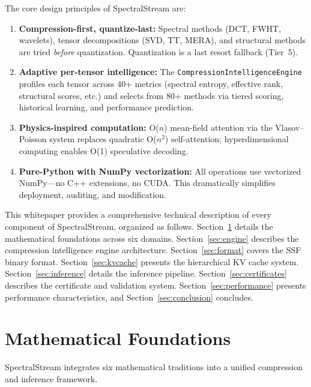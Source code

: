 \documentclass[11pt,a4paper,twocolumn]{article}
\begin{document}
The core design principles of SpectralStream are:

\begin{enumerate}
	\item \textbf{Compression-first, quantize-last:} Spectral methods (DCT, FWHT, wavelets), tensor decompositions (SVD, TT, MERA), and structural methods are tried \emph{before} quantization. Quantization is a last resort fallback (Tier~5).
	\item \textbf{Adaptive per-tensor intelligence:} The \texttt{CompressionIntelligenceEngine} profiles each tensor across 40+ metrics (spectral entropy, effective rank, structural scores, etc.) and selects from 80+ methods via tiered scoring, historical learning, and performance prediction.
	\item \textbf{Physics-inspired computation:} O($n$) mean-field attention via the Vlasov--Poisson system replaces quadratic O($n^2$) self-attention; hyperdimensional computing enables O(1) speculative decoding.
	\item \textbf{Pure-Python with NumPy vectorization:} All operations use vectorized NumPy---no C++ extensions, no CUDA. This dramatically simplifies deployment, auditing, and modification.
\end{enumerate}

This whitepaper provides a comprehensive technical description of every component of SpectralStream, organized as follows. Section~\ref{sec:math} details the mathematical foundations across six domains. Section~\ref{sec:engine} describes the compression intelligence engine architecture. Section~\ref{sec:format} covers the SSF binary format. Section~\ref{sec:kvcache} presents the hierarchical KV cache system. Section~\ref{sec:inference} details the inference pipeline. Section~\ref{sec:certificates} describes the certificate and validation system. Section~\ref{sec:performance} presents performance characteristics, and Section~\ref{sec:conclusion} concludes.

\section{Mathematical Foundations}
\label{sec:math}

SpectralStream integrates six mathematical traditions into a unified compression and inference framework.

\end{document}
